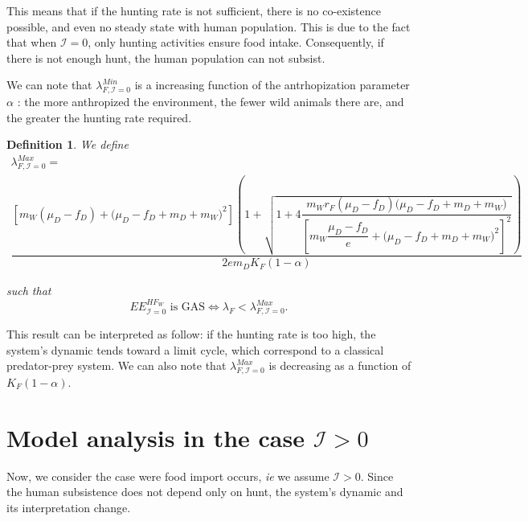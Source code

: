 \documentclass{article}
\newcommand{\lfw}{\lambda_{F}}
\newcommand{\lfw}{\lambda_{F}}
\newcommand{\cI}{\mathcal{I}}
\newtheorem{definition}{Definition}
\begin{document}
This means that if the hunting rate is not sufficient, there is no co-existence possible, and even no steady state with human population. This is due to the fact that when $\cI = 0$, only hunting activities ensure food intake. Consequently, if there is not enough hunt, the human population can not subsist.

We can note that $\lambda_{F, \cI=0}^{Min}$ is a increasing function of the antrhopization parameter $\alpha$ : the more anthropized the environment, the fewer wild animals there are, and the greater the hunting rate required. 

\begin{definition}
We define
\begin{multline*}
\lambda_{F, \cI =0}^{Max}  = \\
 \dfrac{\left[m_{W}(\mu_{D}-f_{D})+\big(\mu_{D}-f_{D}+m_{D}+m_{W})^{2}\right]\left(1+\sqrt{1+4\dfrac{m_{W}r_{F}\left(\mu_{D}-f_{D}\right)\big(\mu_{D}-f_{D}+m_{D}+m_{W})}{\left[m_{W}\dfrac{\mu_{D}-f_{D}}{e}+\big(\mu_{D}-f_{D}+m_{D}+m_{W})^{2}\right]^{2}}}\right)}{2em_D K_F(1- \alpha)}
\end{multline*}

such that $$
\text{$EE^{HF_W}_{\cI = 0}$ is GAS} \Leftrightarrow \lfw < \lambda_{F, \cI =0}^{Max}
.$$
\end{definition}

This result can be interpreted as follow: if the hunting rate is too high, the system's dynamic tends toward a limit cycle, which correspond to a classical predator-prey system. We can also note that $\lambda_{F, \cI =0}^{Max} $ is decreasing as a function of $K_F(1-\alpha)$. 



\section{Model analysis in the case $\cI > 0$}
Now, we consider the case were food import occurs, \textit{ie} we assume $\cI > 0$. Since the human subsistence does not depend only on hunt, the system's dynamic and its interpretation change.
\end{document}
